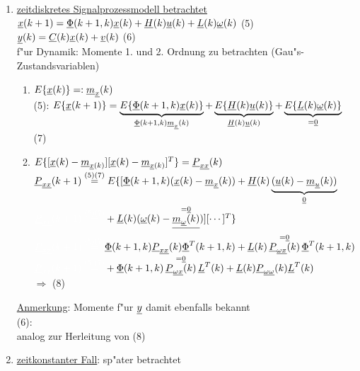 \documentclass[openany,a4paper,11pt]{book}
\begin{document}
\begin{enumerate}[label=(\Alph*)]
    \item \uline{zeitdiskretes Signalprozessmodell betrachtet}\\
    $\uline{x}(k+1)=\uline{\Phi}(k+1,k)\uline{x}(k)+\uline{H}(k)\uline{u}(k)+\uline{L}(k)\uline{\omega}(k)$ \quad (5)\\
    $\uline{y}(k)=\uline{C}(k)\uline{x}(k)+\uline{v}(k)$ \quad (6)\\
    f"ur Dynamik: Momente 1. und 2. Ordnung zu betrachten (Gau"s-Zustandsvariablen)\begin{enumerate}
        \item $E\{\uline{x}(k)\}=:\uline{m}_{\uline{x}}(k)$\\
        (5): $E\{\uline{x}(k+1)\}=\underbrace{E\{\uline{\Phi}(k+1,k)\uline{x}(k)\}}_{\uline{\Phi}(k+1,k)\uline{m}_{\uline{x}}(k)}+\underbrace{E\{\uline{H}(k)\uline{u}(k)\}}_{\uline{H}(k)\uline{u}(k)}+\underbrace{E\{\uline{L}(k)\uline{\omega}(k)\}}_{=\uline{0}}$\\
         \quad (7)\\
        \item $E\{[\uline{x}(k)-\uline{m}_{\uline{x}(k)}][\uline{x}(k)-\uline{m}_{\uline{x}(k)}]^T\}=\uline{P}_{\uline{xx}}(k)$\\
        $\uline{P}_{\uline{xx}}(k+1)\stackrel{(5)(7)}{=}E\{[\uline{\Phi}(k+1,k)(\uline{x}(k)-\uline{m}_{\uline{x}}(k))+\uline{H}(k)\underbrace{(\uline{u}(k)-\uline{m}_{\uline{u}}(k))}_{\uline{0}}$\\
        ${\color{white}\uline{P}_{\uline{xx}}(k+1)\stackrel{(5)(7)}{=}}+\uline{L}(k)(\uline{\omega}(k)-\mathop{\sout{\uline{m}_{\uline{\omega}}(k)}}\limits^{=\uline{0}})][\cdots]^T\}$\\
        ${\color{white}\uline{P}_{\uline{xx}}(k+1)\stackrel{(5)(7)}{=}}\uline{\Phi}(k+1,k)\uline{P}_{\uline{xx}}(k)\uline{\Phi}^T(k+1,k)+\uline{L}(k)\mathop{\uline{P}_{\uline{\omega x}}(k)}\limits^{=\uline{0}}\uline{\Phi}^T(k+1,k)$\\
        ${\color{white}\uline{P}_{\uline{xx}}(k+1)\stackrel{(5)(7)}{=}}+\uline{\Phi}(k+1,k)\mathop{\uline{P}_{\uline{\omega x}}(k)}\limits^{=\uline{0}}\uline{L}^T(k)+\uline{L}(k)\uline{P}_{\uline{\omega\omega}}(k)\uline{L}^T(k)$\\
        $\Rightarrow$  \quad (8)
    \end{enumerate}
    \uline{Anmerkung}: Momente f"ur $\uline{y}$ damit ebenfalls bekannt\\
    (6): \\
    analog zur Herleitung von (8)\\
    \item \uline{zeitkonstanter Fall}: sp"ater betrachtet
\end{enumerate}
\end{document}
